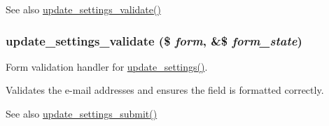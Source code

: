 \begin{DoxySeeAlso}{See also}
\hyperlink{update_8settings_8inc_a1dc52dbb9606fca692a9fb3f8127da01}{update\_\-settings\_\-validate()} 
\end{DoxySeeAlso}
\hypertarget{update_8settings_8inc_a1dc52dbb9606fca692a9fb3f8127da01}{
\subsubsection[{update\_\-settings\_\-validate}]{\setlength{\rightskip}{0pt plus 5cm}update\_\-settings\_\-validate (\$ {\em form}, \/  \&\$ {\em form\_\-state})}}
\label{update_8settings_8inc_a1dc52dbb9606fca692a9fb3f8127da01}
Form validation handler for \hyperlink{group__forms_gaef8e4ae13223ebb2175505c22c6f6fa8}{update\_\-settings()}.

Validates the e-\/mail addresses and ensures the field is formatted correctly.

\begin{DoxySeeAlso}{See also}
\hyperlink{update_8settings_8inc_aeed026cbe23eddff17c100d629c4e3bc}{update\_\-settings\_\-submit()} 
\end{DoxySeeAlso}
